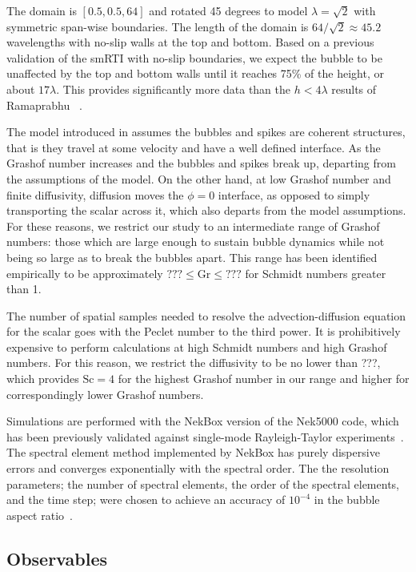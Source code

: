 The domain is $\left[0.5, 0.5, 64\right]$ and rotated 45 degrees to model $\lambda = \sqrt{2}$ with symmetric span-wise boundaries.
The length of the domain is $64/\sqrt{2} \approx 45.2$ wavelengths with no-slip walls at the top and bottom.
Based on a previous validation of the smRTI with no-slip boundaries, we expect the bubble to be unaffected by the top and bottom walls until it reaches 75\% of the height, or about $17\lambda$.
This provides significantly more data than the $h < 4 \lambda$ results of Ramaprabhu \etal~\cite{Ramaprabhu2012}.

The model introduced in  assumes the bubbles and spikes are coherent structures, that is they travel at some velocity and have a well defined interface.
As the Grashof number increases and the bubbles and spikes break up, departing from the assumptions of the model.
On the other hand, at low Grashof number and finite diffusivity, diffusion moves the $\phi = 0$ interface, as opposed to simply transporting the scalar across it, which also departs from the model assumptions.
For these reasons, we restrict our study to an intermediate range of Grashof numbers: those which are large enough to sustain bubble dynamics while not being so large as to break the bubbles apart.
This range has been identified empirically to be approximately $??? \le \text{Gr} \le ???$ for Schmidt numbers greater than 1.

The number of spatial samples needed to resolve the advection-diffusion equation for the scalar goes with the Peclet number to the third power.
It is prohibitively expensive to perform calculations at high Schmidt numbers and high Grashof numbers.  
For this reason, we restrict the diffusivity to be no lower than ???, which provides $\text{Sc} = 4$ for the highest Grashof number in our range and higher for correspondingly lower Grashof numbers.

Simulations are performed with the NekBox version of the Nek5000 code, which has been previously validated against single-mode Rayleigh-Taylor experiments~\cite{Hutchinson2016,Wilkinson2007}.
The spectral element method implemented by NekBox has purely dispersive errors and converges exponentially with the spectral order.
The the resolution parameters; the number of spectral elements, the order of the spectral elements, and the time step; were chosen to achieve an accuracy of $10^{-4}$ in the bubble aspect ratio~\cite{hutchinson2016efficiency}.

\subsection{Observables}

